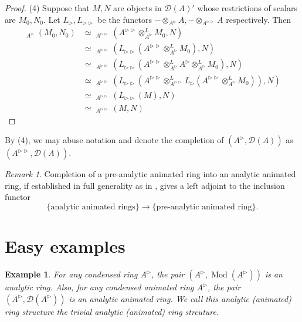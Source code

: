 \documentclass{article}
\theoremstyle{plain}
\newtheorem{exmp}[thm]{Example}
\theoremstyle{definition}
\theoremstyle{remark}
\newtheorem{rmk}[thm]{Remark}
\DeclareMathOperator{\rhoms}{\underline{RHom}}
\DeclareMathOperator{\modcat}{Mod}
\newcommand{\dten}{\otimes ^{L}}
\newcommand{\huflag}{\triangleright}
\newcommand{\D}{\mathcal{D}}
\begin{document}
\begin{proof}
(4)
Suppose that $ M,N $ are objects in $ \D (A)' $ whose restrictions of scalars are $ M _{0}, N _{0} $.
Let $ L _{\huflag}, L _{\huflag\huflag} $ be the functors $ -\otimes _{A ^{\huflag}} A, -\otimes _{A ^{\huflag\huflag}} A $ respectively.
Then
\begin{align*}
\rhoms _{A ^{\huflag}}(M _{0}, N _{0})
&\simeq \rhoms _{A ^{\huflag\huflag}}(A ^{\huflag\huflag}\dten _{A ^{\huflag}}M _{0}, N)\\
&\simeq \rhoms _{A ^{\huflag\huflag}}(L _{\huflag\huflag}( A ^{\huflag\huflag} \dten _{A ^{\huflag}} M _{0} ), N)\\
&\simeq \rhoms _{A ^{\huflag\huflag}}(L _{\huflag\huflag}( A ^{\huflag\huflag} \dten _{A ^{\huflag}} A ^{\huflag} \dten _{A ^{\huflag}} M _{0} ), N)\\
&\simeq \rhoms _{A ^{\huflag\huflag}}(
L _{\huflag\huflag}( A ^{\huflag\huflag} \dten _{A ^{\huflag\huflag}} L _{\huflag}( A ^{\huflag\huflag} \dten _{A ^{\huflag}} M _{0} ) )
, N)\\
&\simeq \rhoms _{A ^{\huflag\huflag}}(L _{\huflag\huflag}(M), N)\\
&\simeq \rhoms _{A ^{\huflag\huflag}}(M, N)
\end{align*}
\end{proof}

By (4), we may abuse notation and denote the completion of $ (A ^{\huflag}, \D (A)) $ as $ (A ^{\huflag\huflag}, \D (A)) $.

\begin{rmk}
Completion of a pre-analytic animated ring into an analytic animated ring,
if established in full generality as in \cite{rodriguez-camargo_notes_nodate},
gives a left adjoint to the inclusion functor
\begin{equation*}
\{\text{analytic animated rings}\}\to \{\text{pre-analytic animated ring}\}.
\end{equation*}
\end{rmk}

\section{Easy examples}

\begin{exmp}
For any condensed ring $ A ^{\huflag} $, the pair $ (A ^{\huflag}, \modcat (A ^{\huflag})) $ is an analytic ring.
Also, for any condensed animated ring $ A ^{\huflag} $, the pair $ (A ^{\huflag}, \D (A ^{\huflag})) $ is an analytic animated ring.
We call this analytic (animated) ring structure the \emph{trivial} analytic (animated) ring strcuture.
\end{exmp}
\end{document}
